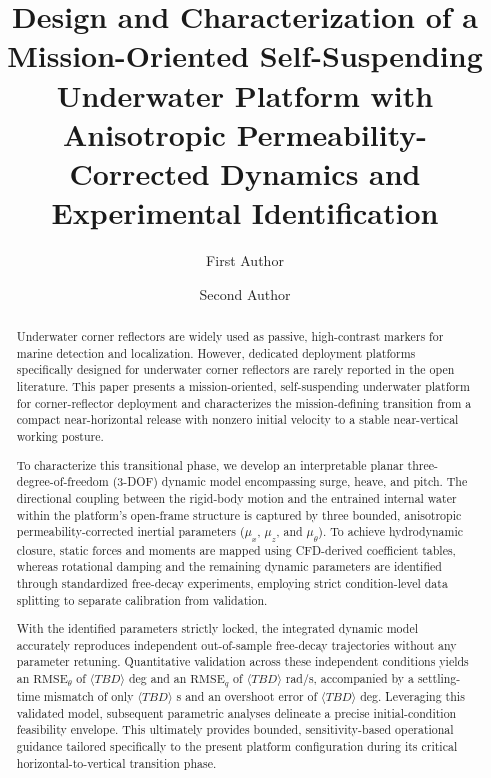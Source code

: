 \documentclass[final,5p,times,twocolumn]{elsarticle}
\begin{document}
\begin{frontmatter}

\title{Design and Characterization of a Mission-Oriented Self-Suspending Underwater Platform with Anisotropic Permeability-Corrected Dynamics and Experimental Identification}

\author[inst1]{First Author}
\author[inst1]{Second Author}

\begin{abstract}
Underwater corner reflectors are widely used as passive, high-contrast markers for marine detection and localization. However, dedicated deployment platforms specifically designed for underwater corner reflectors are rarely reported in the open literature. This paper presents a mission-oriented, self-suspending underwater platform for corner-reflector deployment and characterizes the mission-defining transition from a compact near-horizontal release with nonzero initial velocity to a stable near-vertical working posture.

To characterize this transitional phase, we develop an interpretable planar three-degree-of-freedom (3-DOF) dynamic model encompassing surge, heave, and pitch. The directional coupling between the rigid-body motion and the entrained internal water within the platform's open-frame structure is captured by three bounded, anisotropic permeability-corrected inertial parameters ($\mu_x$, $\mu_z$, and $\mu_\theta$). To achieve hydrodynamic closure, static forces and moments are mapped using CFD-derived coefficient tables, whereas rotational damping and the remaining dynamic parameters are identified through standardized free-decay experiments, employing strict condition-level data splitting to separate calibration from validation.

With the identified parameters strictly locked, the integrated dynamic model accurately reproduces independent out-of-sample free-decay trajectories without any parameter retuning. Quantitative validation across these independent conditions yields an $\mathrm{RMSE}_\theta$ of $\langle TBD\rangle$ deg and an $\mathrm{RMSE}_q$ of $\langle TBD\rangle$ rad/s, accompanied by a settling-time mismatch of only $\langle TBD\rangle$ s and an overshoot error of $\langle TBD\rangle$ deg. Leveraging this validated model, subsequent parametric analyses delineate a precise initial-condition feasibility envelope. This ultimately provides bounded, sensitivity-based operational guidance tailored specifically to the present platform configuration during its critical horizontal-to-vertical transition phase.
\end{abstract}


\end{frontmatter}
\end{document}
